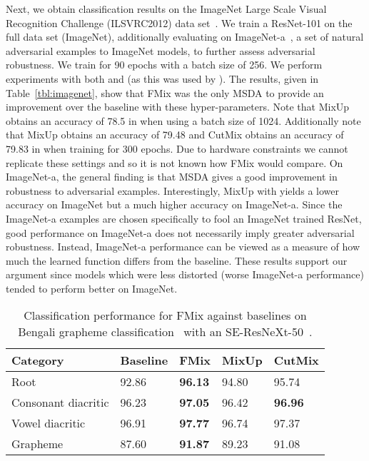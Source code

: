 \documentclass[journal]{IEEEtran}
\newcommand{\fmix}{FMix\xspace}
\newcommand{\mixup}{MixUp\xspace}
\newcommand{\cutmix}{CutMix\xspace}
\newcommand{\imagenet}{ImageNet\xspace}
\begin{document}
Next, we obtain classification results on the ImageNet Large Scale Visual Recognition Challenge (ILSVRC2012) data set~\citep{ILSVRC15}. We train a ResNet-101 on the full data set (\imagenet), additionally evaluating on \mbox{\imagenet-a}~\citep{hendrycks2019natural}, a set of natural adversarial examples to \imagenet models, to further assess adversarial robustness. We train for 90 epochs with a batch size of 256.
We perform experiments with both  and  (as this was used by \citet{zhang2017mixup}). The results, given in Table~\ref{tbl:imagenet}, show that \fmix was the only MSDA to provide an improvement over the baseline with these hyper-parameters. Note that \mixup obtains an accuracy of 78.5 in \citet{zhang2017mixup} when using a batch size of 1024. Additionally note that \mixup obtains an accuracy of 79.48 and \cutmix obtains an accuracy of 79.83 in \citet{yun2019cutmix} when training for 300 epochs. Due to hardware constraints we cannot replicate these settings and so it is not known how \fmix would compare.
On \imagenet-a, the general finding is that MSDA gives a good improvement in robustness to adversarial examples.
Interestingly, \mixup with  yields a lower accuracy on \imagenet but a much higher accuracy on \imagenet-a.
Since the \imagenet-a examples are chosen specifically to fool an \imagenet trained ResNet, good performance on \imagenet-a does not necessarily imply greater adversarial robustness. Instead, \imagenet-a performance can be viewed as a measure of how much the learned function differs from the baseline. These results support our argument since models which were less distorted (worse \imagenet-a performance) tended to perform better on \imagenet.

\begin{table}[t]
    \centering
    \caption{Classification performance for FMix against baselines on Bengali grapheme classification~\citep{bengali} with an SE-ResNeXt-50~\citep{xie2017aggregated,hu2018squeeze}.}
    \begin{tabularx}{\linewidth}{lXXXX}
        \toprule
        Category & Baseline & \fmix{} & \mixup{} & \cutmix{} \\
        \midrule
        Root & 92.86 & \textbf{96.13} & 94.80 & 95.74\\
        Consonant diacritic & 96.23 & \textbf{97.05} & 96.42 & \textbf{96.96}\\
        Vowel diacritic & 96.91 & \textbf{97.77} & 96.74 & 97.37\\
        \cmidrule(lr){1-5}
        Grapheme & 87.60 & \textbf{91.87} & 89.23 & 91.08\\
    \bottomrule
    \end{tabularx}
    \label{tab:bengali}
\end{table}
\end{document}
